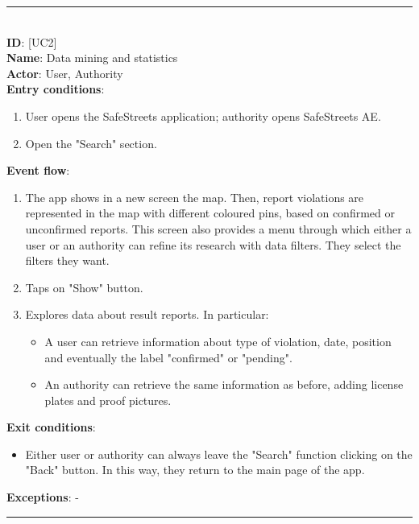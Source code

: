 \documentclass{article}
\newcommand\usecase[1]{ [UC#1] }
\begin{document}
				\rule{\linewidth}{0.4pt}
				\\
				
				\textbf{ID}: \usecase{2} \\
				\textbf{Name}:   Data mining and statistics\\
				\textbf{Actor}:  User, Authority\\
				\textbf{Entry conditions}:
				\begin{enumerate}
					\item User opens the SafeStreets application; authority opens SafeStreets AE.
					\item Open the "Search" section.
				\end{enumerate}
				\textbf{Event flow}:
				\begin{enumerate}
					\item The app shows in a new screen the map. Then, report violations are represented in the map with different coloured pins, based on confirmed or unconfirmed reports. This screen also provides a menu through which either a user or an authority can refine its research with data filters.
					They select the filters they want.
					\item Taps on "Show" button.
					\item Explores data about result reports. In particular:
					\begin{itemize}
						\item A user can retrieve information about type of violation, date, position and eventually the label "confirmed" or "pending".
						\item An authority can retrieve the same information as before, adding license plates and proof pictures.
					\end{itemize}
				\end{enumerate}
				\textbf{Exit conditions}:
				\begin{itemize}
					\item Either user or authority can always leave the "Search" function clicking on the "Back" button. In this way, they return to the main page of the app.
				\end{itemize}
				\textbf{Exceptions}: -\\
				
				\rule{\linewidth}{0.4pt}
				\\
					
\end{document}
